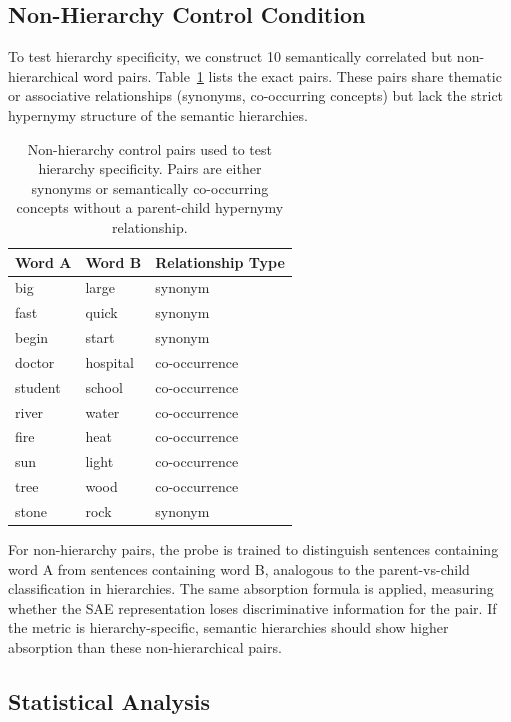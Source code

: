 \documentclass{article}
\begin{document}
\subsection{Non-Hierarchy Control Condition}
\label{sec:non_hierarchy}

To test hierarchy specificity, we construct 10 semantically correlated but non-hierarchical word pairs. Table~\ref{tab:nonhierarchy} lists the exact pairs. These pairs share thematic or associative relationships (synonyms, co-occurring concepts) but lack the strict hypernymy structure of the semantic hierarchies.

\begin{table}[t]
\caption{Non-hierarchy control pairs used to test hierarchy specificity. Pairs are either synonyms or semantically co-occurring concepts without a parent-child hypernymy relationship.}
\label{tab:nonhierarchy}
\centering
\begin{tabular}{lll}
\toprule
Word A & Word B & Relationship Type \\
\midrule
big & large & synonym \\
fast & quick & synonym \\
begin & start & synonym \\
doctor & hospital & co-occurrence \\
student & school & co-occurrence \\
river & water & co-occurrence \\
fire & heat & co-occurrence \\
sun & light & co-occurrence \\
tree & wood & co-occurrence \\
stone & rock & synonym \\
\bottomrule
\end{tabular}
\end{table}

For non-hierarchy pairs, the probe is trained to distinguish sentences containing word A from sentences containing word B, analogous to the parent-vs-child classification in hierarchies. The same absorption formula is applied, measuring whether the SAE representation loses discriminative information for the pair. If the metric is hierarchy-specific, semantic hierarchies should show higher absorption than these non-hierarchical pairs.

\subsection{Statistical Analysis}
\label{sec:statistical}
\end{document}
